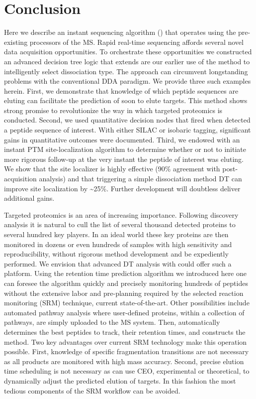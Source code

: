 \section{Conclusion}

Here we describe an instant sequencing algorithm (\inseq{}) that operates using the pre-existing processors of the MS. Rapid real-time sequencing affords several novel data acquisition opportunities. To orchestrate these opportunities we constructed an advanced decision tree logic that extends are our earlier use of the method to intelligently select dissociation type. The approach can circumvent longstanding problems with the conventional DDA paradigm. We provide three such examples herein. First, we demonstrate that knowledge of which peptide sequences are eluting can facilitate the prediction of soon to elute targets. This method shows strong promise to revolutionize the way in which targeted proteomics is conducted. Second, we used quantitative decision nodes that fired when \inseq{} detected a peptide sequence of interest. With either SILAC or isobaric tagging, significant gains in quantitative outcomes were documented. Third, we endowed \inseq{} with an instant PTM site-localization algorithm to determine whether or not to initiate more rigorous follow-up at the very instant the peptide of interest was eluting. We show that the \inseq{} site localizer is highly effective (90\% agreement with post-acquisition analysis) and that triggering a simple dissociation method DT can improve site localization by \textasciitilde25\%. Further development will doubtless deliver additional gains.

Targeted proteomics is an area of increasing importance. Following discovery analysis it is natural to cull the list of several thousand detected proteins to several hundred key players. In an ideal world these key proteins are then monitored in dozens or even hundreds of samples with high sensitivity and reproducibility, without rigorous method development and be expediently performed. We envision that advanced DT analysis with \inseq{} could offer such a platform. Using the retention time prediction algorithm we introduced here one can foresee the \inseq{} algorithm quickly and precisely monitoring hundreds of peptides without the extensive labor and pre-planning required by the selected reaction monitoring (SRM) technique, current state-of-the-art.\cite{srm} Other possibilities include automated pathway analysis where user-defined proteins, within a collection of pathways, are simply uploaded to the MS system. Then, \inseq{} automatically determines the best peptides to track, their retention times, and constructs the method. Two key advantages over current SRM technology make this operation possible. First, knowledge of specific fragmentation transitions are not necessary as all products are monitored with high mass accuracy. Second, precise elution time scheduling is not necessary as \inseq{} can use CEO, experimental or theoretical, to dynamically adjust the predicted elution of targets. In this fashion the most tedious components of the SRM workflow can be avoided.




